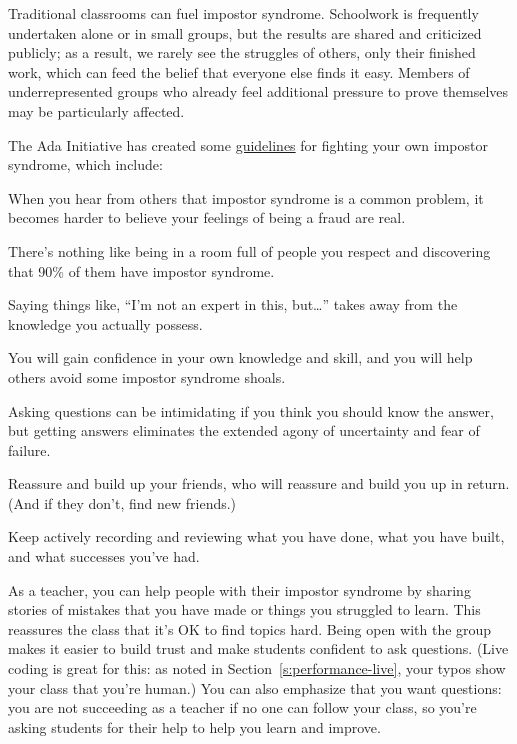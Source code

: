 Traditional classrooms can fuel impostor syndrome. Schoolwork is
frequently undertaken alone or in small groups, but the results are
shared and criticized publicly; as a result, we rarely see the struggles
of others, only their finished work, which can feed the belief that
everyone else finds it easy. Members of underrepresented groups who
already feel additional pressure to prove themselves may be particularly
affected.

The Ada Initiative has created some \href{https://www.usenix.org/blog/impostor-syndrome-proof-yourself-and-your-community}{guidelines} for
fighting your own impostor syndrome, which include:

\begin{description}
\tightlist
\item[Talk about the issue with people you trust.]
When you hear from others that impostor syndrome is a common
problem, it becomes harder to believe your feelings of being a fraud
are real.
\item[Go to an in-person impostor syndrome session.]
There's nothing like being in a room full of people you respect and
discovering that 90\% of them have impostor syndrome.
\item[Watch your words, because they influence how you think.]
Saying things like, ``I'm not an expert in this, but\ldots{}''
takes away from the knowledge you actually possess.
\item[Teach others about your field.]
You will gain confidence in your own knowledge and skill, and you
will help others avoid some impostor syndrome shoals.
\item[Ask questions.]
Asking questions can be intimidating if you think you should know
the answer, but getting answers eliminates the extended agony of
uncertainty and fear of failure.
\item[Build alliances.]
Reassure and build up your friends, who will reassure and build you
up in return. (And if they don't, find new friends.)
\item[Own your accomplishments.]
Keep actively recording and reviewing what you have done, what you
have built, and what successes you've had.
\end{description}

As a teacher, you can help people with their impostor syndrome by
sharing stories of mistakes that you have made or things you struggled
to learn. This reassures the class that it's OK to find topics hard.
Being open with the group makes it easier to build trust and make
students confident to ask questions. (Live coding is great for this: as
noted in Section~\ref{s:performance-live}, your typos show your class
that you're human.) You can also emphasize that you want questions: you
are not succeeding as a teacher if no one can follow your class, so
you're asking students for their help to help you learn and improve.


